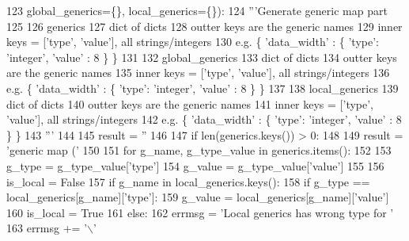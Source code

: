 \begin{DoxyCode}
123                        global\_generics=\{\}, local\_generics=\{\}):
124     \textcolor{stringliteral}{'''Generate generic map part}
125 \textcolor{stringliteral}{}
126 \textcolor{stringliteral}{      generics}
127 \textcolor{stringliteral}{        dict of dicts}
128 \textcolor{stringliteral}{        outter keys are the generic names}
129 \textcolor{stringliteral}{        inner keys = ['type', 'value'], all strings/integers}
130 \textcolor{stringliteral}{        e.g. \{ 'data\_width' : \{ 'type': 'integer', 'value' : 8 \} \}}
131 \textcolor{stringliteral}{}
132 \textcolor{stringliteral}{      global\_generics}
133 \textcolor{stringliteral}{        dict of dicts}
134 \textcolor{stringliteral}{        outter keys are the generic names}
135 \textcolor{stringliteral}{        inner keys = ['type', 'value'], all strings/integers}
136 \textcolor{stringliteral}{        e.g. \{ 'data\_width' : \{ 'type': 'integer', 'value' : 8 \} \}}
137 \textcolor{stringliteral}{}
138 \textcolor{stringliteral}{      local\_generics}
139 \textcolor{stringliteral}{        dict of dicts}
140 \textcolor{stringliteral}{        outter keys are the generic names}
141 \textcolor{stringliteral}{        inner keys = ['type', 'value'], all strings/integers}
142 \textcolor{stringliteral}{        e.g. \{ 'data\_width' : \{ 'type': 'integer', 'value' : 8 \} \}}
143 \textcolor{stringliteral}{    '''}
144 
145     result = \textcolor{stringliteral}{''}
146 
147     \textcolor{keywordflow}{if} len(generics.keys()) > 0:
148 
149         result = \textcolor{stringliteral}{'generic map ('}
150 
151         \textcolor{keywordflow}{for} g\_name, g\_type\_value \textcolor{keywordflow}{in} generics.items():
152 
153             g\_type = g\_type\_value[\textcolor{stringliteral}{'type'}]
154             g\_value = g\_type\_value[\textcolor{stringliteral}{'value'}]
155 
156             is\_local = \textcolor{keyword}{False}
157             \textcolor{keywordflow}{if} g\_name \textcolor{keywordflow}{in} local\_generics.keys():
158                 \textcolor{keywordflow}{if} g\_type == local\_generics[g\_name][\textcolor{stringliteral}{'type'}]:
159                     g\_value = local\_generics[g\_name][\textcolor{stringliteral}{'value'}]
160                     is\_local = \textcolor{keyword}{True}
161                 \textcolor{keywordflow}{else}:
162                     errmsg = \textcolor{stringliteral}{'Local generics has wrong type for '}
163                     errmsg += \textcolor{stringliteral}{'\(\backslash\)'%
}
\end{DoxyCode}
